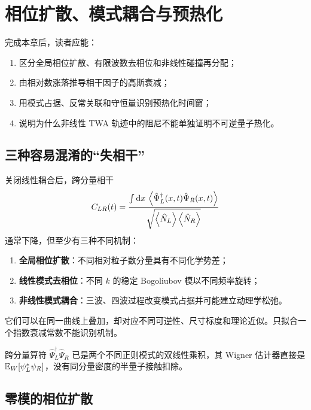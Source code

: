 \chapter{相位扩散、模式耦合与预热化}
\label{ch:phase-dynamics}

\begin{learningobjectives}
完成本章后，读者应能：
\begin{enumerate}
  \item 区分全局相位扩散、有限波数去相位和非线性碰撞再分配；
  \item 由相对数涨落推导相干因子的高斯衰减；
  \item 用模式占据、反常关联和守恒量识别预热化时间窗；
  \item 说明为什么非线性 TWA 轨迹中的阻尼不能单独证明不可逆量子热化。
\end{enumerate}
\end{learningobjectives}

\section{三种容易混淆的“失相干”}

关闭线性耦合后，跨分量相干
\begin{equation}
  C_{LR}(t)=
  \frac{\int\mathop{}\!\mathrm{d} x\,\left\langle \hat\Psi_L^\dagger(x,t)\hat\Psi_R(x,t)\right\rangle}
  {\sqrt{\left\langle \hat N_L\right\rangle\left\langle \hat N_R\right\rangle}}
  \label{eq:intercomponent-coherence}
\end{equation}
通常下降，但至少有三种不同机制：
\begin{enumerate}
  \item \textbf{全局相位扩散}：不同相对粒子数分量具有不同化学势差；
  \item \textbf{线性模式去相位}：不同 $k$ 的稳定 Bogoliubov 模以不同频率旋转；
  \item \textbf{非线性模式耦合}：三波、四波过程改变模式占据并可能建立动理学松弛。
\end{enumerate}
它们可以在同一曲线上叠加，却对应不同可逆性、尺寸标度和理论近似。只拟合一个指数衰减常数不能识别机制。

跨分量算符 $\hat\Psi_L^\dagger\hat\Psi_R$ 已是两个不同正则模式的双线性乘积，其 Wigner 估计器直接是
$\mathbb{E}_{W}\!\left[\psi_L^*\psi_R\right]$，没有同分量密度的半量子接触扣除。

\section{零模的相位扩散}

